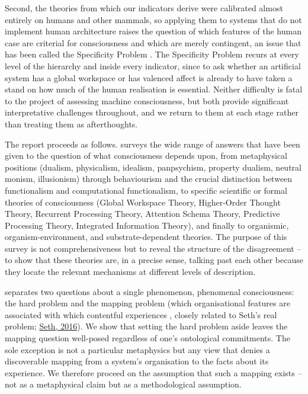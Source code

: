 \documentclass[11pt, a4paper, onecolumn, gdm]{google}
\begin{document}
Second, the theories from which our indicators derive were calibrated almost entirely on humans and other mammals, so applying them to systems that do not implement human architecture raises the question of which features of the human case are criterial for consciousness and which are merely contingent, an issue that has been called the Specificity Problem \citep{shevlin2021}.
The Specificity Problem recurs at every level of the hierarchy and inside every indicator, since to ask whether an artificial system \textquotesingle has a global workspace\textquotesingle{} or \textquotesingle has valenced affect\textquotesingle{} is already to have taken a stand on how much of the human realisation is essential.
Neither difficulty is fatal to the project of assessing machine consciousness, but both provide significant interpretative challenges throughout, and we return to them at each stage rather than treating them as afterthoughts.

The report proceeds as follows.
 surveys the wide range of answers that have been given to the question of what consciousness depends upon, from metaphysical positions (dualism, physicalism, idealism, panpsychism, property dualism, neutral monism, illusionism) through behaviourism and the crucial distinction between functionalism and computational functionalism, to specific scientific or formal theories of consciousness (Global Workspace Theory, Higher-Order Thought Theory, Recurrent Processing Theory, Attention Schema Theory, Predictive Processing Theory, Integrated Information Theory), and finally to organismic, organism-environment, and substrate-dependent theories.
The purpose of this survey is not comprehensiveness but to reveal the structure of the disagreement -- to show that these theories are, in a precise sense, talking past each other because they locate the relevant mechanisms at different levels of description.

 separates two questions about a single phenomenon, phenomenal consciousness: the hard problem \citetext{what consciousness fundamentally is, the subject of Chalmers' hard problem; \citealp{chalmers1995}} and the mapping problem (which organisational features are associated with which contentful experiences \citep{bourget2019}, closely related to Seth's real problem; \href{https://aeon.co/essays/the-hard-problem-of-consciousness-is-a-distraction-from-the-real-one}{Seth, 2016}).
We show that setting the hard problem aside leaves the mapping question well-posed regardless of one's ontological commitments.
The sole exception is not a particular metaphysics but any view that denies a discoverable mapping from a system's organisation to the facts about its experience.
We therefore proceed on the assumption that such a mapping exists -- not as a metaphysical claim but as a methodological assumption.
\end{document}
